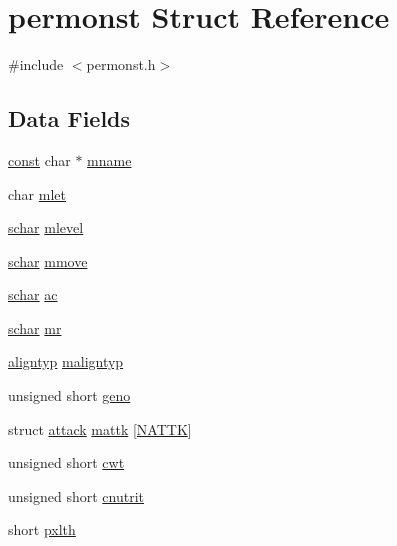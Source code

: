 \hypertarget{structpermonst}{\section{permonst Struct Reference}
\label{structpermonst}
}


{\ttfamily \#include $<$permonst.\+h$>$}

\subsection*{Data Fields}
\begin{DoxyCompactItemize}
\item 
\hyperlink{tradstdc_8h_a2c212835823e3c54a8ab6d95c652660e}{const} char $\ast$ \hyperlink{structpermonst_ae92da7d141243d7e37d4a12340bb248f}{mname}
\item 
char \hyperlink{structpermonst_ab402dbf1bed9d0e595a2b3da6558da92}{mlet}
\item 
\hyperlink{config_8h_a0fd9ce9d735064461bebfe6037026093}{schar} \hyperlink{structpermonst_aeed45d1ab54620bc7e5242b76f1c3c5f}{mlevel}
\item 
\hyperlink{config_8h_a0fd9ce9d735064461bebfe6037026093}{schar} \hyperlink{structpermonst_a939712c539eb16cf6cb51e58ae1c12b0}{mmove}
\item 
\hyperlink{config_8h_a0fd9ce9d735064461bebfe6037026093}{schar} \hyperlink{structpermonst_ad5fd940cc9e0321d3856a88fc02f1c91}{ac}
\item 
\hyperlink{config_8h_a0fd9ce9d735064461bebfe6037026093}{schar} \hyperlink{structpermonst_a5c5f71532c27c38cc57c54ef32bc27f3}{mr}
\item 
\hyperlink{align_8h_a3e17b7a656899892e425fc89481aa2ab}{aligntyp} \hyperlink{structpermonst_ad92ab559c3dc08cc1a40f3413377d787}{maligntyp}
\item 
unsigned short \hyperlink{structpermonst_a0f9f93635f6228a61551c835640b3c1d}{geno}
\item 
struct \hyperlink{structattack}{attack} \hyperlink{structpermonst_a8a558cbb5f8985df95bffa4439856374}{mattk} \mbox{[}\hyperlink{permonst_8h_af9119a416b08e0f343f33a0a7a945e93}{N\+A\+T\+T\+K}\mbox{]}
\item 
unsigned short \hyperlink{structpermonst_aee69b23cdcca0ae25f25eff876ab86ae}{cwt}
\item 
unsigned short \hyperlink{structpermonst_ac13149ec4e586659f7556acf7aab9b01}{cnutrit}
\item 
short \hyperlink{structpermonst_ac6628ec4e0329495573f800c2107e0e3}{pxlth}

\end{DoxyCompactItemize}
